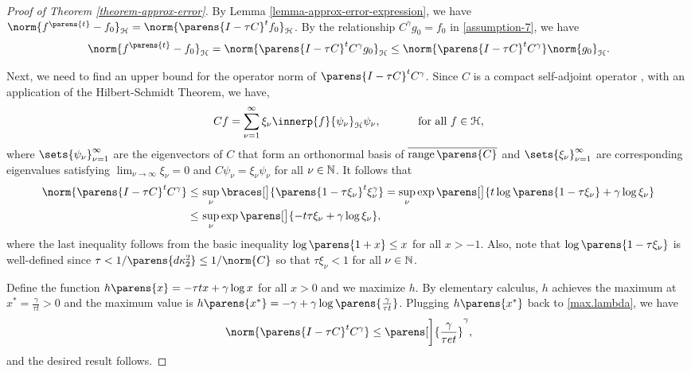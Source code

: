 \begin{proof}[Proof of Theorem \ref{theorem-approx-error}]
	By Lemma \ref{lemma-approx-error-expression}, we have $\norm{f^{\parens{t}} - f_0}_{\hil} = \norm{\parens{I - \tau C}^t f_0}_{\hil}$. By the relationship $C^{\gamma} g_0 = f_0$ in \ref{assumption-7}, we have 
	\begin{align*}
		\norm{f^{\parens{t}} - f_0 }_{\calH} = \norm{ \parens{I - \tau C}^t C^{\gamma} g_0}_{\calH} 
		\le \norm{ \parens{I - \tau C}^t C^{\gamma}} \norm{g_0}_{\calH}. 
	\end{align*}
	
	Next, we need to find an upper bound for the operator norm of $\parens{I - \tau C}^t C^{\gamma}$. Since $C$ is a compact self-adjoint operator \parencite[Theorem 4(i) in][]{Sriperumbudur-density-estimation-inf-exp-family}, with an application of the Hilbert-Schmidt Theorem, we have, 
	\begin{align*}
		C f = \sum_{\nu=1}^{\infty} \xi_{\nu} \innerp{f}{\psi_\nu}_{\calH} \psi_\nu, \qquad \quad \text{ for all } f \in \hil, 
	\end{align*}
	where $\sets{\psi_{\nu}}_{\nu=1}^{\infty}$ are the eigenvectors of $C$ that form an orthonormal basis of $\overline{\range \parens{C}}$ and $\sets{\xi_{\nu}}_{\nu=1}^{\infty}$ are corresponding eigenvalues satisfying $\lim_{\nu \to \infty} \xi_{\nu} = 0$ and $C \psi_{\nu} = \xi_{\nu} \psi_{\nu}$ for all $\nu \in \mathbb{N}$. It follows that 
	\begin{align}
		\norm{ \parens{I - \tau C}^t C^{\gamma}} \le & \, \sup_{\nu} \braces[\big]{ \parens{1 - \tau \xi_{\nu}}^t \xi_{\nu}^{\gamma}} \nonumber 
		= \sup_{\nu} \exp \parens[\big]{t \log \parens{1 - \tau \xi_{\nu}} + \gamma \log \xi_{\nu}} \nonumber \\ 
		\le & \, \sup_{\nu} \exp \parens[\big]{ - t \tau \xi_{\nu} + \gamma \log \xi_{\nu}}, \label{max.lambda}
	\end{align}
	where the last inequality follows from the basic inequality $\log \parens{1+x} \le x$ for all $x > - 1$. Also, note that $\log \parens{1 - \tau \xi_{\nu}}$ is well-defined since $\tau < 1 / \parens{d\kappa_2^2} \le 1 / \norm{C}$ so that $\tau \xi_{\nu} < 1$ for all $\nu \in \mathbb{N}$. 

	Define the function $h \parens{x} = - \tau t x + \gamma \log x$ for all $x > 0$ and we maximize $h$. By elementary calculus, $h$ achieves the maximum at $x^* = \frac{\gamma}{\tau t} > 0$ and the maximum value is $h \parens{x^*} = -\gamma + \gamma \log \parens{\frac{\gamma}{\tau t}}$. Plugging $h \parens{x^*}$ back to \eqref{max.lambda}, we have 
	\begin{align}
		\norm{ \parens{I - \tau C}^t C^{\gamma}} \le \parens[\bigg]{\frac{\gamma}{\tau e t}}^{\gamma}, 
	\end{align}
	and the desired result follows. 
\end{proof}


